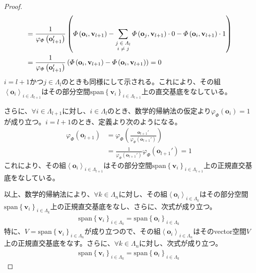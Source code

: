 \documentclass[dvipdfmx]{jsarticle}
\begin{document}
\begin{proof}
\begin{align*}
&= \frac{1}{\varphi_{\varPhi}\left( \mathbf{o}_{l + 1}' \right)}\left( \varPhi\left( \mathbf{o}_{i},\mathbf{v}_{l + 1} \right) - \sum_{\scriptsize \begin{matrix} j \in \varLambda_{l}\\i \neq j\\\end{matrix}} {\varPhi\left( \mathbf{o}_{j},\mathbf{v}_{l + 1} \right) \cdot 0} - \varPhi\left( \mathbf{o}_{i},\mathbf{v}_{l + 1} \right) \cdot 1 \right)\\
&= \frac{1}{\varphi_{\varPhi}\left( \mathbf{o}_{l + 1}' \right)}\left( \varPhi\left( \mathbf{o}_{i},\mathbf{v}_{l + 1} \right) - \varPhi\left( \mathbf{o}_{i},\mathbf{v}_{l + 1} \right) \right) = 0
\end{align*}
$i = l + 1$かつ$j \in \varLambda_{l}$のときも同様にして示される。これにより、その組$\left\langle \mathbf{o}_{i} \right\rangle_{i \in \varLambda_{l + 1}}$はその部分空間$\mathrm{span}\left\{ \mathbf{v}_{i} \right\}_{i \in \varLambda_{l + 1}}$上の直交基底をなしている。\par
さらに、$\forall i \in \varLambda_{l + 1}$に対し、$i \in \varLambda_{l}$のとき、数学的帰納法の仮定より$\varphi_{\varPhi}\left( \mathbf{o}_{i} \right) = 1$が成り立つ。$i = l + 1$のとき、定義より次のようになる。
\begin{align*}
\varphi_{\varPhi}\left( \mathbf{o}_{l + 1} \right) &= \varphi_{\varPhi}\left( \frac{\mathbf{o}_{l + 1}'}{\varphi_{\varPhi}\left( \mathbf{o}_{l + 1}' \right)} \right)\\
&= \frac{1}{\varphi_{\varPhi}\left( \mathbf{o}_{l + 1}' \right)}\varphi_{\varPhi}\left( \mathbf{o}_{l + 1}' \right) = 1
\end{align*}
これにより、その組$\left\langle \mathbf{o}_{i} \right\rangle_{i \in \varLambda_{l + 1}}$はその部分空間$\mathrm{span}\left\{ \mathbf{v}_{i} \right\}_{i \in \varLambda_{l + 1}}$上の正規直交基底をなしている。\par
以上、数学的帰納法により、$\forall k \in \varLambda_{n}$に対し、その組$\left\langle \mathbf{o}_{i} \right\rangle_{i \in \varLambda_{k}}$はその部分空間$\mathrm{span}\left\{ \mathbf{v}_{i} \right\}_{i \in \varLambda_{k}}$上の正規直交基底をなし、さらに、次式が成り立つ。
\begin{align*}
\mathrm{span}\left\{ \mathbf{v}_{i} \right\}_{i \in \varLambda_{k}} = \mathrm{span}\left\{ \mathbf{o}_{i} \right\}_{i \in \varLambda_{k}}
\end{align*}
特に、$V = \mathrm{span}\left\{ \mathbf{v}_{i} \right\}_{i \in \varLambda_{n}}$が成り立つので、その組$\left\langle \mathbf{o}_{i} \right\rangle_{i \in \varLambda_{n}}$はそのvector空間$V$上の正規直交基底をなす。さらに、$\forall k \in \varLambda_{n}$に対し、次式が成り立つ。
\begin{align*}
\mathrm{span}\left\{ \mathbf{v}_{i} \right\}_{i \in \varLambda_{k}} = \mathrm{span}\left\{ \mathbf{o}_{i} \right\}_{i \in \varLambda_{k}}
\end{align*}
\end{proof}\par
\end{document}

